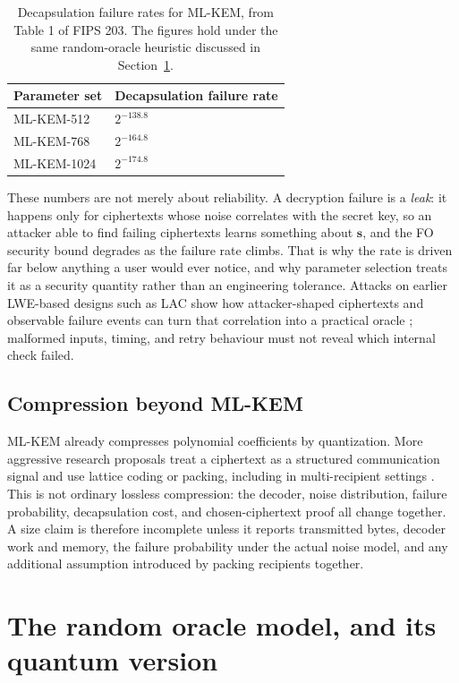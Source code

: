 \begin{table}[H]
\centering
\begin{tabular}{ll}
\toprule
\textbf{Parameter set} & \textbf{Decapsulation failure rate} \\
\midrule
ML-KEM-512  & $2^{-138.8}$ \\
ML-KEM-768  & $2^{-164.8}$ \\
ML-KEM-1024 & $2^{-174.8}$ \\
\bottomrule
\end{tabular}
\caption{Decapsulation failure rates for ML-KEM, from Table 1 of FIPS 203. The
figures hold under the same random-oracle heuristic discussed in
Section~\ref{sec:qrom}.}
\label{tab:mlkem-failure}
\end{table}

These numbers are not merely about reliability. A decryption failure is a
\emph{leak}: it happens only for ciphertexts whose noise correlates with the
secret key, so an attacker able to find failing ciphertexts learns something
about $\mathbf{s}$, and the FO security bound degrades as the failure rate
climbs. That is why the rate is driven far below anything a user would ever
notice, and why parameter selection treats it as a security quantity rather than
an engineering tolerance. Attacks on earlier LWE-based designs such as LAC show
how attacker-shaped ciphertexts and observable failure events can turn that
correlation into a practical oracle \cite{laccca2019}; malformed inputs, timing,
and retry behaviour must not reveal which internal check failed.

\subsection{Compression beyond ML-KEM}

ML-KEM already compresses polynomial coefficients by quantization. More aggressive
research proposals treat a ciphertext as a structured communication signal and use
lattice coding or packing, including in multi-recipient settings
\cite{latticecodedkyber2025}. This is not ordinary lossless compression: the
decoder, noise distribution, failure probability, decapsulation cost, and
chosen-ciphertext proof all change together. A size claim is therefore incomplete
unless it reports transmitted bytes, decoder work and memory, the failure
probability under the actual noise model, and any additional assumption introduced
by packing recipients together.

\section{The random oracle model, and its quantum version}
\label{sec:qrom}

